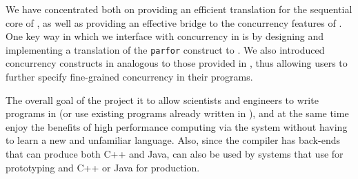 We have concentrated both on providing an efficient translation for the         
sequential core of \xten, as well as providing an effective bridge to           
the concurrency features of \xten. One key way in which we interface          
with concurrency in \matlab is by designing and implementing a                  
translation of the \matlab \texttt{parfor} construct to \xten.  We also                 
introduced concurrency constructs in \matlab analogous to those provided        
in \xten, thus allowing users to further specify fine-grained                   
concurrency in their programs.   

The overall goal of the \mixten project it to allow scientists and              
engineers to write programs in \matlab (or use existing programs already        
written in \matlab), and at the same time enjoy the benefits of high            
performance computing via the \xten system without having to learn a new        
and unfamiliar language.   Also, since the \xten compiler has back-ends         
that can produce both C++ and Java,  \mixten can also be used by systems        
that use \matlab for prototyping and C++ or Java for production.  


